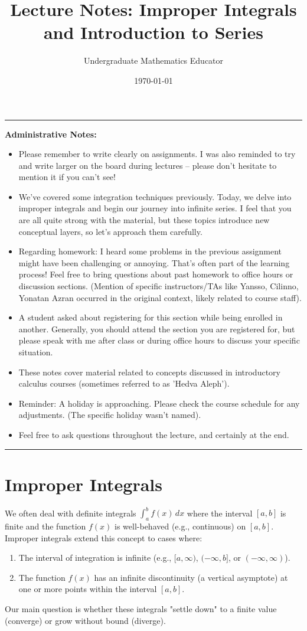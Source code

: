 \documentclass[11pt]{article}
\title{Lecture Notes: Improper Integrals and Introduction to Series}
\author{Undergraduate Mathematics Educator}
\date{\today}
\theoremstyle{definition}
\theoremstyle{remark}
\newenvironment{announcement}
  {\medskip\par\noindent\begin{center}\rule{\linewidth}{0.4pt}\end{center}\smallskip\par\noindent\textbf{Administrative Notes:}\begin{itemize}}
  {\end{itemize}\smallskip\par\noindent\begin{center}\rule{\linewidth}{0.4pt}\end{center}\medskip}
\begin{document}
\maketitle

\begin{announcement}
    \item Please remember to write clearly on assignments. I was also reminded to try and write larger on the board during lectures – please don't hesitate to mention it if you can't see!
    \item We've covered some integration techniques previously. Today, we delve into improper integrals and begin our journey into infinite series. I feel that you are all quite strong with the material, but these topics introduce new conceptual layers, so let's approach them carefully.
    \item Regarding homework: I heard some problems in the previous assignment might have been challenging or annoying. That's often part of the learning process! Feel free to bring questions about past homework to office hours or discussion sections. (Mention of specific instructors/TAs like Yansso, Cilinno, Yonatan Azran occurred in the original context, likely related to course staff).
    \item A student asked about registering for this section while being enrolled in another. Generally, you should attend the section you are registered for, but please speak with me after class or during office hours to discuss your specific situation.
    \item These notes cover material related to concepts discussed in introductory calculus courses (sometimes referred to as 'Hedva Aleph').
    \item Reminder: A holiday is approaching. Please check the course schedule for any adjustments. (The specific holiday wasn't named).
    \item Feel free to ask questions throughout the lecture, and certainly at the end.
\end{announcement}

\section{Improper Integrals}

We often deal with definite integrals $\int_a^b f(x)\,dx$ where the interval $[a,b]$ is finite and the function $f(x)$ is well-behaved (e.g., continuous) on $[a,b]$. Improper integrals extend this concept to cases where:
\begin{enumerate}
    \item The interval of integration is infinite (e.g., $[a, \infty)$, $(-\infty, b]$, or $(-\infty, \infty)$).
    \item The function $f(x)$ has an infinite discontinuity (a vertical asymptote) at one or more points within the interval $[a,b]$.
\end{enumerate}
Our main question is whether these integrals "settle down" to a finite value (converge) or grow without bound (diverge).
\end{document}
